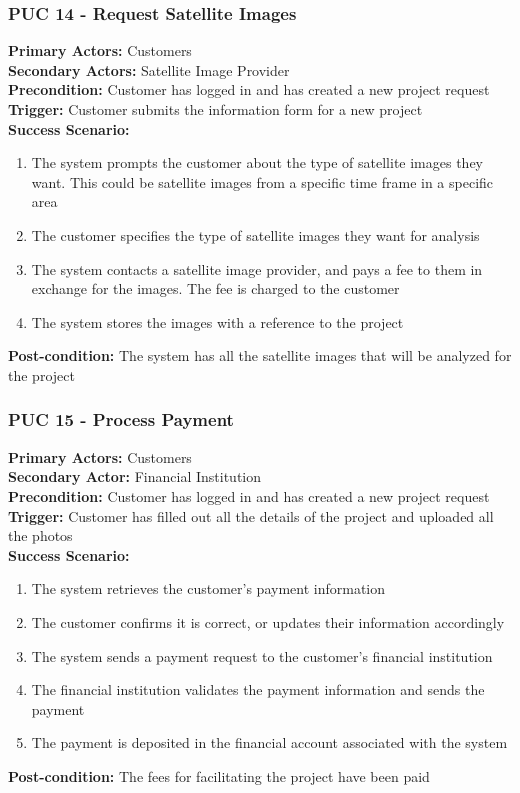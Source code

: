 \documentclass[12pt]{article}
\begin{document}
\subsubsection{PUC 14 - Request Satellite Images}
\textbf{Primary Actors:} Customers\\
\textbf{Secondary Actors:} Satellite Image Provider\\
\textbf{Precondition:} Customer has logged in and has created a new project request\\
\textbf{Trigger:} Customer submits the information form for a new project\\
\textbf{Success Scenario:}
\begin{enumerate}
    \item The system prompts the customer about the type of satellite images they want. This could be satellite images from a specific time frame in a specific area
    \item The customer specifies the type of satellite images they want for analysis
    \item The system contacts a satellite image provider, and pays a fee to them in exchange for the images. The fee is charged to the customer
    \item The system stores the images with a reference to the project
\end{enumerate}
\textbf{Post-condition:} The system has all the satellite images that will be analyzed for the project

\subsubsection{PUC 15 - Process Payment}
\textbf{Primary Actors:} Customers\\
\textbf{Secondary Actor:} Financial Institution\\
\textbf{Precondition:} Customer has logged in and has created a new project request\\
\textbf{Trigger:} Customer has filled out all the details of the project and uploaded all the photos\\
\textbf{Success Scenario:}
\begin{enumerate}
    \item The system retrieves the customer's payment information
    \item The customer confirms it is correct, or updates their information accordingly
    \item The system sends a payment request to the customer's financial institution
    \item The financial institution validates the payment information and sends the payment
    \item The payment is deposited in the financial account associated with the system
\end{enumerate}
\textbf{Post-condition:} The fees for facilitating the project have been paid
\end{document}
